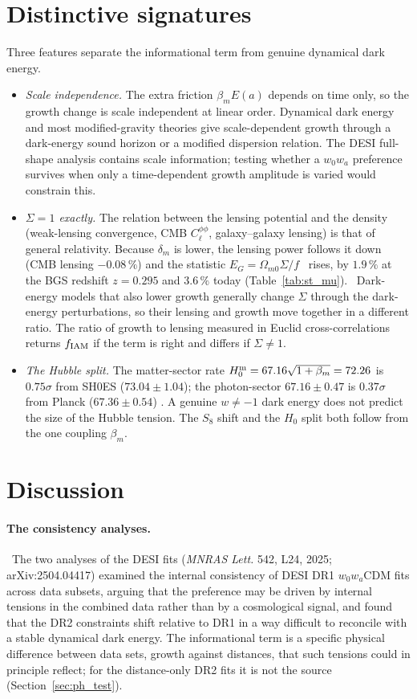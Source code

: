 \section{Distinctive signatures}\label{sec:ph_signatures}
Three features separate the informational term from genuine dynamical dark energy.
\begin{itemize}
\item \emph{Scale independence.} The extra friction $\beta_mE(a)$ depends on time only, so the growth change is scale independent at linear order.
Dynamical dark energy and most modified-gravity theories give scale-dependent growth through a dark-energy sound horizon or a modified dispersion
relation. The DESI full-shape analysis contains scale information; testing whether a $w_0w_a$ preference survives when only a time-dependent growth
amplitude is varied would constrain this. \prediction
\item \emph{$\Sigma=1$ exactly.} The relation between the lensing potential and the density (weak-lensing convergence, CMB $C_\ell^{\phi\phi}$,
galaxy--galaxy lensing) is that of general relativity. Because $\delta_m$ is lower, the lensing power follows it down (CMB lensing $-0.08\,\%$) and the
statistic $E_G=\Omega_{m0}\Sigma/f$~\cite{Zhang2007EG} rises, by $1.9\,\%$ at the BGS redshift $z=0.295$ and $3.6\,\%$ today (Table~\ref{tab:st_mu}). \calc\ Dark-energy models that
also lower growth generally change $\Sigma$ through the dark-energy perturbations, so their lensing and growth move together in a different ratio. The
ratio of growth to lensing measured in Euclid cross-correlations returns $f_{\rm IAM}$ if the term is right and differs if $\Sigma\neq1$. \prediction
\item \emph{The Hubble split.} The matter-sector rate $H_0^{\rm m}=67.16\sqrt{1+\beta_m}=72.26$ is $0.75\sigma$ from SH0ES ($73.04\pm1.04$); the photon-sector
$67.16\pm0.47$ is $0.37\sigma$ from Planck ($67.36\pm0.54$) \calc. A genuine $w\neq-1$ dark energy does not predict the size of the Hubble tension. The
$S_8$ shift and the $H_0$ split both follow from the one coupling $\beta_m$. \interp
\end{itemize}

\section{Discussion}
\paragraph{The consistency analyses.} \observed\ The two analyses of the DESI fits (\emph{MNRAS Lett.} 542, L24, 2025; arXiv:\allowbreak{}2504.04417)
examined the internal consistency of DESI DR1 $w_0w_a$CDM fits across data subsets, arguing that the preference may be driven by internal tensions in
the combined data rather than by a cosmological signal, and found that the DR2 constraints shift relative to DR1 in a way difficult to reconcile with a
stable dynamical dark energy. The informational term is a specific physical difference between data sets, growth against distances, that such
tensions could in principle reflect; for the distance-only DR2 fits it is not the source (Section~\ref{sec:ph_test}). \interp

